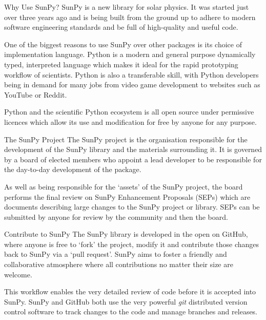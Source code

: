 \documentclass[a0paper,landscape]{baposter}
\begin{document}
\begin{poster}
\begin{posterbox}[name=why,column=2,below=introduction]{Why Use SunPy?}
SunPy is a new library for solar physics. It was started just over three years ago and is being built from the ground up to adhere to modern software engineering standards and be full of high-quality and useful code.

One of the biggest reasons to use SunPy over other packages is its choice of implementation language.
Python is a modern and general purpose dynamically typed, interpreted language which makes it ideal for the rapid prototyping workflow of scientists. 
Python is also a transferable skill, with Python developers being in demand for many jobs from video game development to websites such as YouTube or Reddit.

Python and the scientific Python ecosystem is all open source under permissive licences which allow its use and modification for free by anyone for any purpose.
\end{posterbox}

\begin{posterbox}[name=project,column=2,below=why]{The SunPy Project}
The SunPy project is the organisation responsible for the development of the SunPy library and the materials surrounding it.
It is governed by a board of elected members who appoint a lead developer to be responsible for the day-to-day development of the package.

As well as being responsible for the `assets' of the SunPy project, the board performs the final review on SunPy Enhancement Proposals (SEPs) which are documents describing large changes to the SunPy project or library. SEPs can be submitted by anyone for review by the community and then the board.
\end{posterbox}

\begin{posterbox}[name=development,column=2,below=project]{Contribute to SunPy}
The SunPy library is developed in the open on GitHub, where anyone is free to `fork' the project, modify it and contribute those changes back to SunPy via a `pull request'.
SunPy aims to foster a friendly and collaborative atmosphere where all contributions no matter their size are welcome.

This workflow enables the very detailed review of code before it is accepted into SunPy.
SunPy and GitHub both use the very powerful \textit{git} distributed version control software to track changes to the code and manage branches and releases.
\end{posterbox}


\end{poster}
\end{document}
